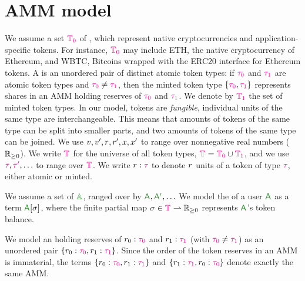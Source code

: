 \section{AMM model}


We assume a set  $\TokU[0]$ of ,
which represent native cryptocurrencies and application-specific tokens.
For instance, $\TokU[0]$ may include ETH, the native cryptocurrency
of Ethereum, and WBTC, \ie
Bitcoins wrapped with the ERC20 interface for Ethereum tokens.
A  is an unordered pair of distinct 
atomic token types:
if $\tokT[0]$ and $\tokT[1]$ are atomic token types 
and $\tokT[0] \neq \tokT[1]$,
then the minted token type $\tokM{\tokT[0]}{\tokT[1]}$ 
represents shares in an AMM holding reserves of $\tokT[0]$ and $\tokT[1]$.
We denote by $\TokU[1]$ the set of minted token types.
In our model, tokens are \emph{fungible},
\ie individual units of the same type are interchangeable.
This means that amounts of tokens of the same type
can be split into smaller parts,
and two amounts of tokens of the same type can be joined.
We use $\valV, \valVi, \ammR, \ammRi, x, x'$ to range over
nonnegative real numbers ($\RNN$).
We write $\TokU$ for the universe of all token types, 
\ie $\TokU = \TokU[0] \cup \TokU[1]$,
and we use $\tokT,\tokTi,\ldots$ to range over $\TokU$.
We write \mbox{$\ammR:\tokT$} to denote $\ammR$ units
of a token of type $\tokT$, either atomic or minted. 


We assume a set of  $\PmvU$,
ranged over by $\pmvA, \pmvAi, \ldots$
We model the  of a user $\pmvA$ as a term
$\wal{\pmvA}{\tokBal}$, where the finite partial map
$\tokBal \in \TokU \rightharpoonup \RNN$
represents $\pmvA$'s token balance.


We model an  holding reserves of \mbox{$\ammR[0]:\tokT[0]$} and
\mbox{$\ammR[1]:\tokT[1]$} (with $\tokT[0] \neq \tokT[1]$) 
as an unordered pair \mbox{$\amm{\ammR[0]:\tokT[0]}{\ammR[1]:\tokT[1]}$}.
Since the order of the token reserves in an AMM is immaterial, 
the terms \mbox{$\amm{\ammR[0]:\tokT[0]}{\ammR[1]:\tokT[1]}$}
and \mbox{$\amm{\ammR[1]:\tokT[1]}{\ammR[0]:\tokT[0]}$}
denote exactly the same AMM.


